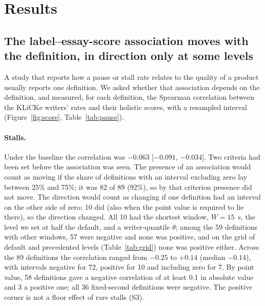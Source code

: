 \section{Results}
\label{sec:results}

\subsection{The label--essay-score association moves with the definition, in direction only at some levels}
\label{sec:res-score}

A study that reports how a pause or stall rate relates to the quality of a product usually reports one definition. We
asked whether that association depends on the definition, and measured, for each definition, the Spearman
correlation between the KLiCKe writers' rates and their holistic scores, with a resampled interval
(Figure~\ref{fig:score}, Table~\ref{tab:pause}).

\paragraph{Stalls.} Under the baseline the correlation was $-0.063$ [$-0.091$, $-0.034$]. Two criteria had been set
before the association was seen. The presence of an association would count as moving if the share of definitions
with an interval excluding zero lay between 25\% and 75\%; it was 82 of 89 (92\%), so by that criterion presence did not
move. The direction would count as changing if one definition had an interval on the other side of zero; 10 did (also
when the point value is required to lie there), so the direction changed. All 10 had the shortest window,
$W = 15$~s, the level we set at half the default, and a writer-quantile $\theta$; among the 59 definitions with
other windows, 57 were negative and none was positive, and on the grid of default and precedented levels
(Table~\ref{tab:grid}) none was positive either. Across the 89 definitions the
correlation ranged from $-0.25$ to $+0.14$ (median $-0.14$), with intervals negative for 72, positive for 10 and
including zero for 7. By point value, 58 definitions gave a negative correlation of at least 0.1 in absolute value and 3
a positive one; all 36 fixed-second definitions were negative. The positive corner is not a floor effect of rare
stalls (S3).

